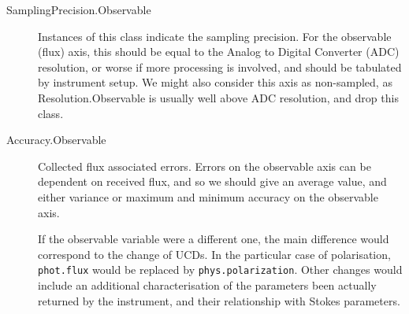 \begin{description}
				 \item[SamplingPrecision.Observable] Instances of
				this class indicate the sampling precision. For the
				observable (flux) axis, this should be equal to the
				Analog to Digital Converter (ADC) resolution, or
				worse if more processing is involved, and should be
				tabulated by instrument setup. We might also
				consider this axis as non-sampled, as
				Resolution.Observable is usually well above ADC
				resolution, and drop this class.
				
				 \item[Accuracy.Observable] Collected flux
				associated errors. Errors on the observable axis
				can be dependent on received flux, and so we should
				give an average value, and either variance or
				maximum and minimum accuracy on the observable
				axis.
				
				 If the observable variable were a different one,
				the main difference would correspond to the change
				of UCDs. In the particular case of polarisation,
				\texttt{phot.flux} would be replaced by
				\texttt{phys.polarization}. Other changes would
				include an additional characterisation of the
				parameters been actually returned by the
				instrument, and their relationship with Stokes
				parameters.
			\end{description}
			
